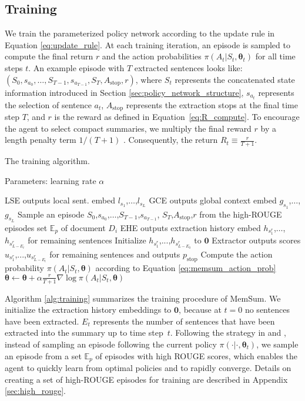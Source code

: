 \documentclass[11pt]{article}
\begin{document}
\subsection{Training}
\label{sec:training}
We train the parameterized policy network according to the update rule in Equation \eqref{eq:update_rule}. At each training iteration, an episode is sampled to compute the final return $r$ and the action probabilities $\pi(A_t\vert S_t, \bm{\theta}_t)$ for all time steps $t$. An example episode with $T$ extracted sentences looks like: $(S_0, s_{a_0},\dots,S_{T-1},s_{a_{T-1}}, S_{T}, A_{\text{stop}},r)$, where $S_t$ represents the concatenated state information introduced in Section \ref{sec:policy_network_structure}, $s_{a_t}$ represents the selection of sentence $a_t$, $A_{\text{stop}}$ represents the extraction stops at the final time step $T$, and $r$ is the reward as defined in Equation~\eqref{eq:R_compute}. To encourage the agent to select compact summaries, we multiply the final reward $r$ by a length penalty term $1/(T+1)$  \cite{luo2019reading}. Consequently, the return $R_t\equiv\frac{r}{T+1}$.
\begin{algorithm}
\caption{The training algorithm.}
\label{alg:training}
Parameters: learning rate $\alpha$
\begin{algorithmic}[1]
    \State LSE outputs local sent. embed $l_{s_1}$,$\dots$,$l_{s_L}$
    \State GCE outputs global context embed $g_{s_1}$,$\dots$,$g_{s_L}$
    \State Sample an episode $S_0$,$s_{a_0}$,$\dots$,$S_{T-1}$,$s_{a_{T-1}}$, $S_{T}$,$A_{\text{stop}}$,$r$ from the high-ROUGE episodes set $\mathbb{E}_p$ of document $D_i$ 
            \State EHE outputs extraction history embed $h_{s^r_1}$,$\dots$,$h_{s^r_{L-E_{t}}}$ for remaining sentences
        \Else
               \State Initialize $h_{s^r_1}$,...,$h_{s^r_{L-E_{0}}}$ to $\bm{0}$
        \EndIf
        \State Extractor outputs scores $u_{s_1^r}$,...,$u_{s_{L-E_t}^r}$ for remaining sentences and outputs $p_{\text{stop}}$
        \State Compute the action probability $\pi(A_t\vert S_t,\bm{\theta})$ according to Equation \eqref{eq:memsum_action_prob}
        \State $\bm{\theta} \leftarrow \bm{\theta} + \alpha \frac{r}{T+1} \nabla \log \pi(A_t\vert S_t,\bm{\theta}) $
    \EndFor
\EndFor
\end{algorithmic}
\end{algorithm}

Algorithm \ref{alg:training} summarizes the training procedure of MemSum. 
We initialize the extraction history embeddings to $\bm{0}$, because at $t=0$ no sentences have been extracted. $E_t$ represents the number of sentences that have been extracted into the summary up to time step~$t$. Following the strategy in \citet{narayan2018ranking} and \citet{mohsen2020hierarchical}, instead of sampling an episode following the current policy $\pi(\cdot\vert \cdot,\bm{\theta}_t)$, we sample an episode from a set $\mathbb{E}_p$ of episodes with high ROUGE scores, which enables the agent to quickly learn from optimal policies and to rapidly converge. Details on creating a set of high-ROUGE episodes for training are described in Appendix \ref{sec:high_rouge}.
\end{document}
